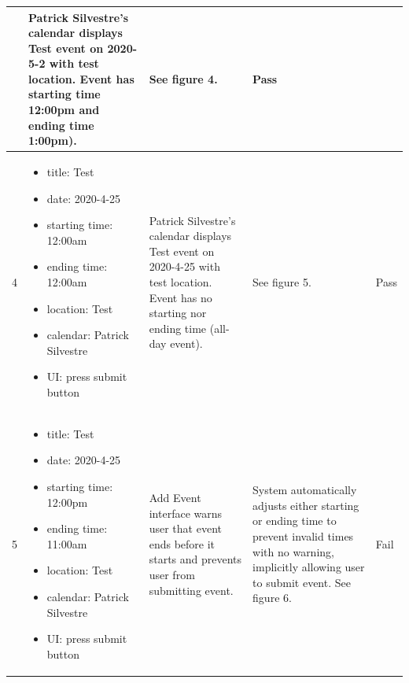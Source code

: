 \documentclass[10pt,letterpaper]{article}
\begin{document}
\begin{table}[h!]
\begin{tabularx}{\textwidth}{lXXXl}
\begin{itemize}
  \end{itemize} &
  Patrick Silvestre's calendar displays Test event on 2020-5-2 with test location. Event has starting time 12:00pm and ending time 1:00pm). &
  See figure 4. &
  Pass \\ \midrule
4 &
  \begin{itemize}
    \item{title: Test}
    \item{date: 2020-4-25}
    \item{starting time: 12:00am}
    \item{ending time: 12:00am}
    \item{location: Test}
    \item{calendar: Patrick Silvestre}
    \item{UI: press submit button}
  \end{itemize} &
  Patrick Silvestre's calendar displays Test event on 2020-4-25 with test location. Event has no starting nor ending time (all-day event). &
  See figure 5. &
  Pass \\ \midrule
5 &
  \begin{itemize}
    \item{title: Test}
    \item{date: 2020-4-25}
    \item{starting time: 12:00pm}
    \item{ending time: 11:00am}
    \item{location: Test}
    \item{calendar: Patrick Silvestre}
    \item{UI: press submit button}
  \end{itemize} &
  Add Event interface warns user that event ends before it starts and prevents user from submitting event. &
  System automatically adjusts either starting or ending time to prevent invalid times with no warning, implicitly allowing user to submit event. See figure 6. &
  Fail \\ \bottomrule
\end{tabularx}
\end{table}
\end{document}
